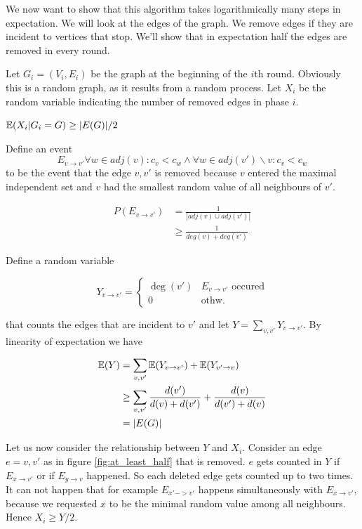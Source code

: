 We now want to show that this algorithm takes logarithmically many steps in expectation. We will look at the edges of the graph. We remove edges if they are incident to vertices that stop. We'll show that in expectation half the edges are removed in every round. 

Let $G_i=(V_i,E_i)$ be the graph at the beginning of the $i$th round. Obviously this is a random graph, as it results from a random process. Let $X_i$ be the random variable indicating the number of removed edges in phase $i$.

\begin{lem} \label{lem:at_least_half}$\mathbb{E}(X_i |G_i = G) \geq |E(G)|/2$ \end{lem}

\begin{pr} Define an event
\[E_{v\rightarrow v'} \forall w\in adj(v): c_v<c_w \wedge \forall w\in adj(v') \backslash {v} : c_v < c_w\]
to be the event that the edge ${v,v'}$ is removed because $v$ entered the maximal independent set and $v$ had the smallest random value of all neighbours of $v'$.

\begin{align*}
P(E_{v\rightarrow v'}) &= \frac{1}{| adj(v) \cup adj(v') |}\\
	&\geq \frac{1}{deg(v) + deg(v')}	
\end{align*}

Define a random variable 

\[Y_{v\rightarrow v'} = \begin{cases} \deg(v') & E_{v\rightarrow v'} \text{ occured} \\ 0 & \text{othw.}\end{cases}\]

that counts the edges that are incident to $v'$ and let $Y=\sum_{v,v'} Y_{v\rightarrow v'}$. By linearity of expectation we have

\begin{align*}
\mathbb{E}(Y) &= \sum_{v,v'} \mathbb{E}(Y_{v\rightarrow v'}) + \mathbb{E}(Y_{v'\rightarrow v}) \\
	&\geq \sum_{v,v'} \frac{d(v')}{d(v)+d(v')} + \frac{d(v)}{d(v')+d(v)}\\
	&= |E(G)|
\end{align*}

Let us now consider the relationship between $Y$ and $X_i$. Consider an edge $e={v,v'}$ as in figure \ref{fig:at_least_half} that is removed. $e$ gets counted in $Y$ if $E_{x\rightarrow v'}$ or if $E_{y\rightarrow v}$ happened. So each deleted edge gets counted up to two times. It can not happen that for example $E_{x'->v'}$ happens simultaneously with $E_{x\rightarrow v'}$, because we requested $x$ to be the minimal random value among all neighbours. Hence $X_i \geq Y/2$.


\end{pr}
